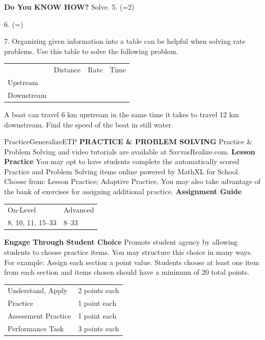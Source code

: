 \documentclass{article}
\newenvironment{concept-summary}{}{}    %
\newenvironment{te-addendum}[2]{}{}     %
\newcommand{\answer}[1]{}               %
\newcommand{\placeholder}[2]{}          %
\newcommand{\te}[1]{}                   %
\begin{document}
\begin{concept-summary}
\answer{Once the original equation has been multiplied by the LCD, the solution might yield values that are not solutions to the original equation.}
\textbf{Do You KNOW HOW?}
Solve.
5. (=2)
\answer{(x=-4)}
6. (=)
\answer{(x=3)}
7. Organizing given information into a table can be helpful when solving rate problems. Use this table to solve the following problem.
\begin{tabular}{llll}
 & Distance & Rate & Time \\
Upstream & & & \\
Downstream & & & \\
\end{tabular}
A boat can travel 6 km upstream in the same time it takes to travel 12 km downstream. Find the speed of the boat in still water.
\placeholder{illustration}{Boat traveling beneath raised drawbridge over blue river. Callouts: River Current = 4 km/h; Upstream: 6 km; Downstream: 12 km. Opposing black arrows parallel to boat's course mark upstream and downstream directions.}
\answer{12 km/h}
\end{concept-summary}
\begin{te-addendum}{Practice}{GeneralizeETP}
\textbf{PRACTICE \& PROBLEM SOLVING}
Practice \& Problem Solving and video tutorials are available at SavvasRealize.com.
\textbf{Lesson Practice} You may opt to have students complete the automatically scored Practice and Problem Solving items online powered by MathXL for School.
Choose from: Lesson Practice; Adaptive Practice.
You may also take advantage of the bank of exercises for assigning additional practice.
\textbf{Assignment Guide}
\begin{tabular}{ll}
On-Level & Advanced \\
8, 10, 11, 15--33 & 8--33 \\
\end{tabular}
\textbf{Engage Through Student Choice}
Promote student agency by allowing students to choose practice items. You may structure this choice in many ways.
For example:
Assign each section a point value. Students choose at least one item from each section and items chosen should have a minimum of 20 total points.
\begin{tabular}{ll}
Understand, Apply & 2 points each \\
Practice & 1 point each \\
Assessment Practice & 1 point each \\
Performance Task & 3 points each \\
\end{tabular}
\te{Scan the QR code to access a video tutorial. SavvasRealize.com. See answers for Exercises 16--25 on next page.}
\end{te-addendum}
\end{document}
